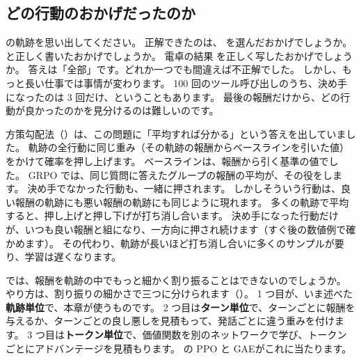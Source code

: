 \subsection{どの行動のおかげだったのか}

の軌跡を思い出してください。
正解できたのは、 を選んだおかげでしょうか。
 と正しく書いたおかげでしょうか。
電卓の結果  を正しく写したおかげでしょうか。
答えは「全部」です。どれか一つでも間違えば不正解でした。
しかし、もっと長い仕事では事情が変わります。
100 回のツール呼び出しのうち、決め手になったのは 3 回だけ、ということもあります。
最後の報酬だけから、どの行動が良かったのかを見分けるのは難しいのです。

方策勾配法（）は、この問題に「平均すれば分かる」という答えを出していました。
軌跡の全行動に同じ重み（その軌跡の報酬からベースラインを引いた値）をかけて確率を押し上げます。
ベースラインは、報酬から引く基準の値でした。
GRPO では、同じ質問に答えたグループの報酬の平均が、その役をします。
決め手でなかった行動も、一緒に押されます。
しかしそういう行動は、良い報酬の軌跡にも悪い報酬の軌跡にも同じように現れます。
多くの軌跡で平均すると、押し上げと押し下げが打ち消し合います。
決め手になった行動だけが、いつも良い報酬と組になり、一方向に押され続けます（すぐ後の数値例で確かめます）。
その代わり、軌跡が長いほど打ち消し合いに多くのサンプルが要り、学習は遅くなります。

では、報酬を軌跡の中でもっと細かく割り振ることはできないのでしょうか。
やり方は、割り振りの細かさで三つに分けられます（）。
1 つ目が、いま述べた\textbf{軌跡単位}で、本章が使うものです。
2 つ目は\textbf{ターン単位}で、ターンごとに報酬を与えるか、ターンごとの良し悪しを見積もって、発話ごとに違う重みを付けます。
3 つ目は\textbf{トークン単位}で、価値関数を別のネットワークで学び、トークンごとにアドバンテージを見積もります。
の PPO と GAE\cite{schulman2017proximal,schulman2016high}がこれに当たります。

